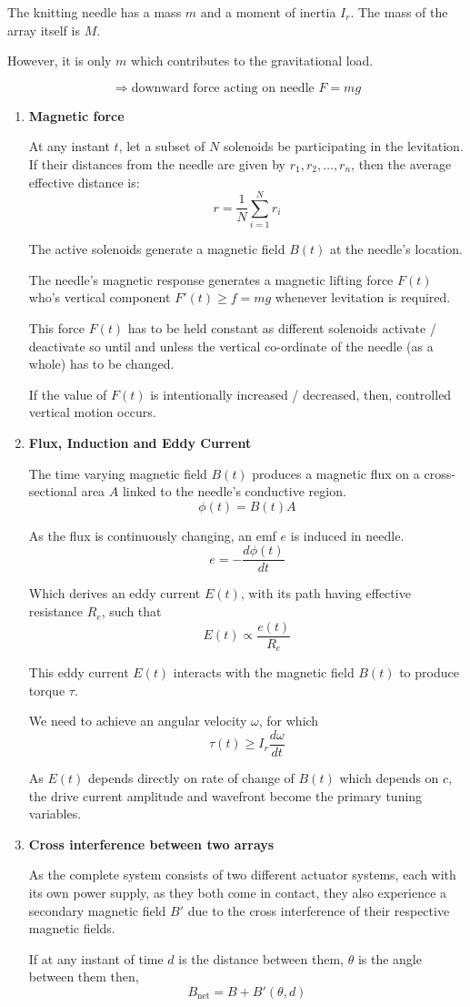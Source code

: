 \documentclass[10pt]{article}
\begin{document}
The knitting needle has a mass $m$ and a moment of inertia $I_r$. The mass of the array itself is $M$.

However, it is only $m$ which contributes to the gravitational load.

\[
\Rightarrow \text{downward force acting on needle } F=mg
\]

\begin{enumerate}
  \item \textbf{Magnetic force}

  At any instant $t$, let a subset of $N$ solenoids be participating in the levitation. If their distances from the needle are given by $r_1, r_2, \ldots, r_n$, then the average effective distance is:
  \[
    r=\frac{1}{N}\sum_{i=1}^{N}r_i
  \]

  The active solenoids generate a magnetic field $B(t)$ at the needle's location.

  The needle's magnetic response generates a magnetic lifting force $F(t)$ who's vertical component $F'(t)\geq f=mg$ whenever levitation is required.

  This force $F(t)$ has to be held constant as different solenoids activate / deactivate so until and unless the vertical co-ordinate of the needle (as a whole) has to be changed.

  If the value of $F(t)$ is intentionally increased / decreased, then, controlled vertical motion occurs.

  \item \textbf{Flux, Induction and Eddy Current}

  The time varying magnetic field $B(t)$ produces a magnetic flux on a cross-sectional area $A$ linked to the needle's conductive region.
  \[
    \phi(t)=B(t)A
  \]

  As the flux is continuously changing, an emf $e$ is induced in needle.
  \[
    e=-\frac{d\phi(t)}{dt}
  \]

  Which derives an eddy current $E(t)$, with its path having effective resistance $R_e$, such that
  \[
    E(t)\propto\frac{e(t)}{R_e}
  \]

  This eddy current $E(t)$ interacts with the magnetic field $B(t)$ to produce torque $\tau$.

  We need to achieve an angular velocity $\omega$, for which
  \[
    \tau(t)\geq I_r\frac{d\omega}{dt}
  \]

  As $E(t)$ depends directly on rate of change of $B(t)$ which depends on $c$, the drive current amplitude and wavefront become the primary tuning variables.

  \item \textbf{Cross interference between two arrays}

  As the complete system consists of two different actuator systems, each with its own power supply, as they both come in contact, they also experience a secondary magnetic field $B'$ due to the cross interference of their respective magnetic fields.

  If at any instant of time $d$ is the distance between them, $\theta$ is the angle between them then,
  \[
    B_{\mathrm{net}}=B+B'(\theta,d)
  \]
\end{enumerate}
\end{document}
